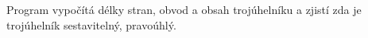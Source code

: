 Program vypočítá délky stran, obvod a obsah trojúhelníku a zjistí zda je trojúhelník sestavitelný, pravoúhlý. 